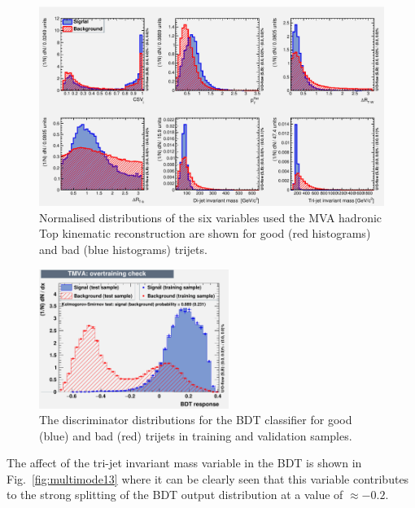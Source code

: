 \begin{figure}[ht!]
\centering
\includegraphics[width=\linewidth]{images/Run2/variables_id_c1.pdf}
\caption{Normalised distributions of the six variables used the MVA hadronic Top kinematic reconstruction are shown for good (red histograms) and bad (blue histograms) trijets.}
\label{fig:TrijetBDTInputFeatures13}
\end{figure}

\begin{figure}[ht!]
\begin{center}
    \includegraphics[width=0.55\textwidth]{images/Run2/overtrain_BDT.pdf}
    \caption{The discriminator distributions for the BDT classifier for good (blue) and bad (red) trijets in training and validation samples.}
    \label{fig:TrijetBDTOutput13}
\end{center}
\end{figure}

The affect of the tri-jet invariant mass variable in the BDT is shown in Fig.~\ref{fig:multimode13} where it can be clearly seen that this variable contributes to the strong splitting of the BDT output distribution at a value of $\approx-0.2$.

